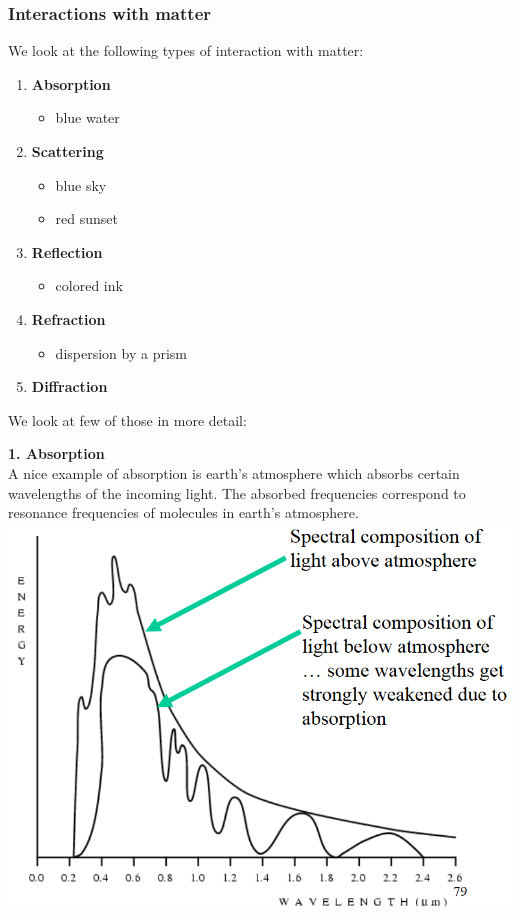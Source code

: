 \documentclass[a4paper, fontsize=8pt, landscape, DIV=1]{scrartcl}
\begin{document}
\begin{multicols*}{4}
		\subsubsection{Interactions with matter}
		We look at the following types of interaction with matter: 
		\begin{enumerate}[noitemsep]
			\item \textbf{Absorption}
				\begin{itemize}[label={$\rightarrow$}]
					\item blue water
				\end{itemize}
			\item \textbf{Scattering}
				\begin{itemize}[label={$\rightarrow$}]
					\item blue sky
					\item red sunset
				\end{itemize}
			\item \textbf{Reflection}
				\begin{itemize}[label={$\rightarrow$}]
					\item colored ink
				\end{itemize} 
			\item \textbf{Refraction}
				\begin{itemize}[label={$\rightarrow$}]
					\item dispersion by a prism
				\end{itemize} 
			\item \textbf{Diffraction} 
		\end{enumerate}
		 We look at few of those in more detail:
		 \par
		  
		 \textbf{1. Absorption}\\
		 A nice example of absorption is earth's atmosphere which absorbs certain wavelengths of the incoming light. The absorbed frequencies correspond to resonance frequencies of molecules in earth's atmosphere.\\ 
		 \includegraphics[width=\columnwidth]{images/Introduction/absorption_earth.png}
		 \clearpage 
		 

\end{multicols*}
\end{document}
